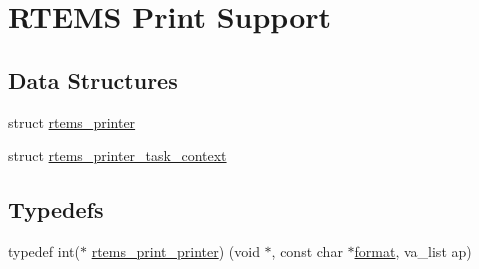 \hypertarget{group__RTEMSPrintSupport}{}\section{R\+T\+E\+MS Print Support}
\label{group__RTEMSPrintSupport}
\subsection*{Data Structures}
\begin{DoxyCompactItemize}
\item 
struct \mbox{\hyperlink{structrtems__printer}{rtems\+\_\+printer}}
\item 
struct \mbox{\hyperlink{structrtems__printer__task__context}{rtems\+\_\+printer\+\_\+task\+\_\+context}}
\end{DoxyCompactItemize}
\subsection*{Typedefs}
\begin{DoxyCompactItemize}
\item 
typedef int($\ast$ \mbox{\hyperlink{group__RTEMSPrintSupport_ga1a1d078f9f2a229f68b017e3c21ded61}{rtems\+\_\+print\+\_\+printer}}) (void $\ast$, const char $\ast$\mbox{\hyperlink{structformat}{format}}, va\+\_\+list ap)
\end{DoxyCompactItemize}

